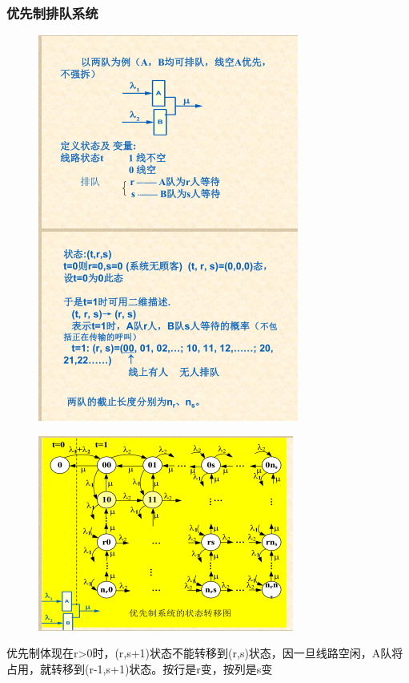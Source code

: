 \subsubsection{优先制排队系统}
\begin{figure}[H]
	\centering
	\includegraphics[width=0.5\linewidth]{figures/prove_10}
	\caption{}
	\label{fig:prove10}
\end{figure}
\begin{figure}[H]
	\centering
	\includegraphics[width=0.5\linewidth]{figures/prove_11}
	\caption{}
	\label{fig:prove11}
\end{figure}
优先制体现在r>0时，(r,s+1)状态不能转移到(r,s)状态，因一旦线路空闲，A队将占用，就转移到(r-1,s+1)状态。按行是r变，按列是s变
